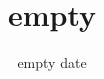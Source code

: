 \documentclass[12pt,a4paper]{article}
\title{empty}
\date{empty date}
\begin{document}
	\makefirstpage
	
	
	\clearpage
	
	\tableofcontents
	\clearpage
	
\end{document}
